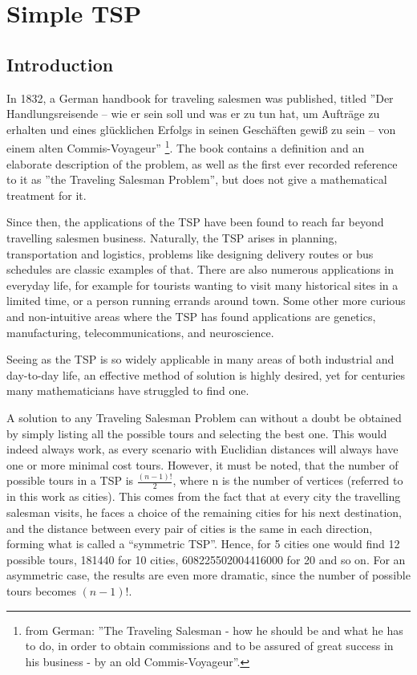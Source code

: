 \chapter{Simple TSP}

\section{Introduction}

\par
In 1832, a German handbook for traveling salesmen was published, titled ''Der Handlungsreisende – wie er sein soll und was er zu tun hat, um Aufträge zu erhalten und eines glücklichen Erfolgs in seinen Geschäften gewiß zu sein – von einem alten Commis-Voyageur'' \footnote{%
	from German: ''The Traveling Salesman - how he should be and what he has to do, in order to obtain commissions and to be assured of great success in his business - by an old Commis-Voyageur''.}. 
 The book contains a definition and an elaborate description of the problem, as well as the first ever recorded reference to it as ''the Traveling Salesman Problem'', but does not give a mathematical treatment for it. 
 
\vspace{5mm}
Since then, the applications of the TSP have been found to reach far beyond travelling salesmen business. Naturally, the TSP arises in planning, transportation and logistics, problems like designing delivery routes or bus schedules are classic examples of that. There are also numerous applications in everyday life, for example for tourists wanting to visit many historical sites in a limited time, or a person running errands around town. Some other more curious and non-intuitive areas where the TSP has found applications are genetics, manufacturing, telecommunications, and neuroscience.

\vspace{5mm}
Seeing as the TSP is so widely applicable in many areas of both industrial and day-to-day life, an effective method of solution is highly desired, yet for centuries many mathematicians have struggled to find one.

\vspace{5mm}
A solution to any Traveling Salesman Problem can without a doubt be obtained by simply listing all the possible tours and selecting the best one. This would indeed always work, as every scenario with Euclidian distances will always have one or more minimal cost tours. However, it must be noted, that the number of possible tours in a TSP is $\frac{(n-1)!}{2}$, where n is the number of vertices (referred to in this work as cities). This comes from the fact that at every city the travelling salesman visits, he faces a choice of the remaining cities for his next destination, and the distance between every pair of cities is the same in each direction, forming what is called a “symmetric TSP”. Hence, for 5 cities one would find 12 possible tours, 181440 for 10 cities, 608225502004416000 for 20 and so on. For an asymmetric case, the results are even more dramatic, since the number of possible tours becomes $(n-1)!$.

